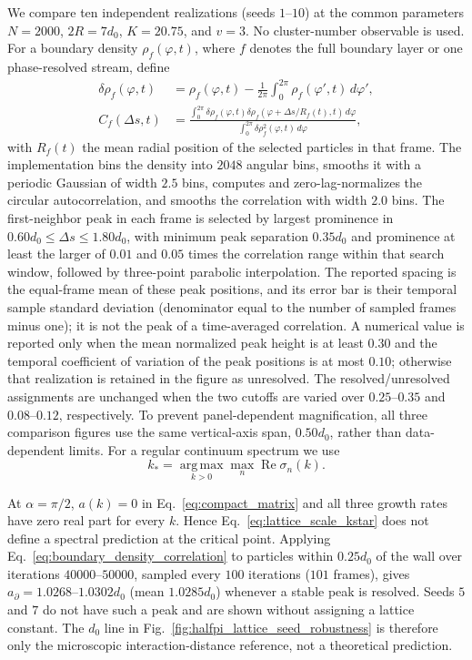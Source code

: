 \documentclass[11pt]{article}
\numberwithin{equation}{section}
\begin{document}
We compare ten independent realizations (seeds $1$--$10$) at the common
parameters $N=2000$, $2R=7d_0$, $K=20.75$, and $v=3$.  No cluster-number
observable is used.  For a boundary density $\rho_f(\varphi,t)$, where $f$
denotes the full boundary layer or one phase-resolved stream, define
\begin{align}
 \delta\rho_f(\varphi,t)
 &=\rho_f(\varphi,t)-\frac{1}{2\pi}
   \int_0^{2\pi}\rho_f(\varphi',t)\,d\varphi',\\
 C_f(\Delta s,t)
 &=\frac{\int_0^{2\pi}
   \delta\rho_f(\varphi,t)
   \delta\rho_f(\varphi+\Delta s/R_f(t),t)\,d\varphi}
 {\int_0^{2\pi}\delta\rho_f^2(\varphi,t)\,d\varphi},
 \label{eq:boundary_density_correlation}
\end{align}
with $R_f(t)$ the mean radial position of the selected particles in that frame.
The implementation bins the density into $2048$ angular bins, smooths it
with a periodic Gaussian of width $2.5$ bins, computes and zero-lag-normalizes
the circular autocorrelation, and smooths the correlation with width $2.0$ bins.
The first-neighbor peak in each frame is selected by largest prominence in
$0.60d_0\leq\Delta s\leq1.80d_0$, with minimum peak separation $0.35d_0$
and prominence at least the larger of $0.01$ and $0.05$ times the correlation
range within that search window, followed by three-point parabolic interpolation.
The reported spacing is the equal-frame mean of these peak positions, and
its error bar is their temporal sample standard deviation (denominator equal
to the number of sampled frames minus one);
it is not the peak of a time-averaged correlation. A numerical value is
reported only when the mean normalized peak height is at least $0.30$ and the
temporal coefficient of variation of the peak positions is at most $0.10$; otherwise that realization
is retained in the figure as unresolved.  The resolved/unresolved assignments
are unchanged when the two cutoffs are varied over $0.25$--$0.35$ and
$0.08$--$0.12$, respectively.  To prevent panel-dependent magnification, all
three comparison figures use the same vertical-axis span, $0.50d_0$, rather
than data-dependent limits.  For a regular continuum spectrum we use
\begin{equation}
  k_\ast=\underset{k>0}{\operatorname{arg\,max}}
  \max_n\operatorname{Re}\sigma_n(k) .
  \label{eq:lattice_scale_kstar}
\end{equation}

At $\alpha=\pi/2$, $a(k)=0$ in Eq.~\eqref{eq:compact_matrix} and all three
growth rates have zero real part for every $k$.  Hence Eq.~\eqref{eq:lattice_scale_kstar}
does not define a spectral prediction at the critical point.  Applying
Eq.~\eqref{eq:boundary_density_correlation} to particles within $0.25d_0$ of
the wall over iterations $40000$--$50000$, sampled every $100$ iterations
($101$ frames), gives
$a_\partial=1.0268$--$1.0302d_0$ (mean $1.0285d_0$) whenever a stable peak is
resolved.  Seeds $5$ and $7$ do not have such a peak and are shown without
assigning a lattice constant.  The $d_0$ line in
Fig.~\ref{fig:halfpi_lattice_seed_robustness} is therefore only the microscopic
interaction-distance reference, not a theoretical prediction.
\end{document}
